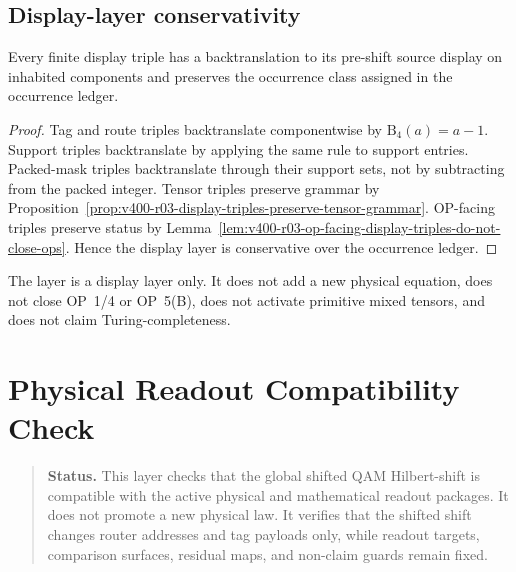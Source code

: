 \subsection{Display-layer conservativity}
\label{subsec:v400-r03-display-layer-conservativity}

\begin{theorem}
\label{thm:v400-r03-global-reindexed-display-conservativity}
Every finite display triple has a backtranslation to its pre-shift source
display on inhabited components and preserves the occurrence class assigned in
the occurrence ledger.
\end{theorem}

\begin{proof}
Tag and route triples backtranslate componentwise by
$\mathrm B_4(a)=a-1$. Support triples backtranslate by applying the same rule
to support entries. Packed-mask triples backtranslate through their support
sets, not by subtracting from the packed integer. Tensor triples preserve
grammar by Proposition~\ref{prop:v400-r03-display-triples-preserve-tensor-grammar}.
OP-facing triples preserve status by
Lemma~\ref{lem:v400-r03-op-facing-display-triples-do-not-close-ops}. Hence the
display layer is conservative over the occurrence ledger.
\end{proof}

\begin{remark}
\label{rem:v400-r03-non-claim}
The layer is a display layer only. It does not add a new physical equation,
does not close OP~1/4 or OP~5(B), does not activate primitive mixed tensors, and
does not claim Turing-completeness.
\end{remark}



\clearpage
\section{Physical Readout Compatibility Check}
\label{sec:v400-r04-physical-readout-compatibility-check}

\begin{quote}\small
\noindent\textbf{Status.}
This layer checks that the global shifted QAM Hilbert-shift is compatible with
the active physical and mathematical readout packages. It does not promote a
new physical law. It verifies that the shifted shift changes router addresses and
tag payloads only, while readout targets, comparison surfaces, residual maps,
and non-claim guards remain fixed.
\end{quote}

